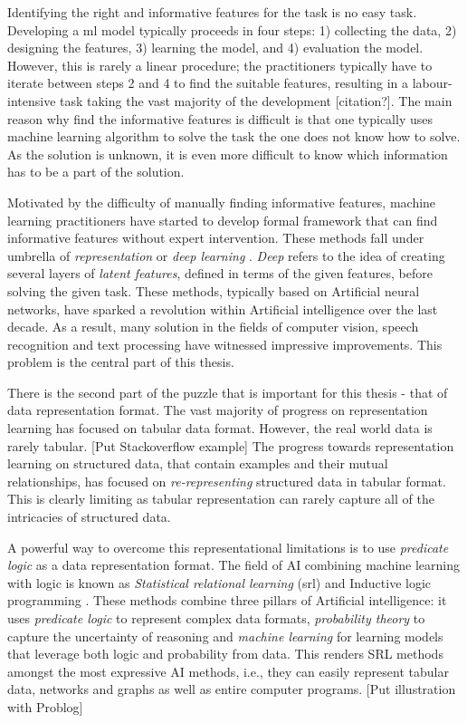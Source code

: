 Identifying the right and informative features for the task is no easy task.
Developing a \gls{ml} model typically proceeds in four steps: 1) collecting the data, 2) designing the features, 3) learning the model, and 4) evaluation the model.
However, this is rarely a linear procedure; the practitioners typically have to iterate between steps 2 and 4 to find the suitable features, resulting in a labour-intensive task taking the vast majority of the development [citation?].
The main reason why find the informative features is difficult is that one typically uses machine learning algorithm to solve the task the one does not know how to solve.
As the solution is unknown, it is even more difficult to know which information has to be a part of the solution.



Motivated by the difficulty of manually finding informative features, machine learning practitioners have started to develop formal framework that can find informative features without expert intervention.
These methods fall under umbrella of \textit{representation} or \textit{deep learning} \cite{Goodfellow2016, Bengio:2009}.
\textit{Deep} refers to the idea of creating several layers of \textit{latent features}, defined in terms of the given features, before solving the given task.
These methods, typically based on Artificial neural networks, have sparked a revolution within Artificial intelligence over the last decade.
As a result, many solution in the fields of computer vision, speech recognition and text processing have witnessed impressive improvements.
This problem is the central part of this thesis.



There is the second part of the puzzle that is important for this thesis - that of data representation format.
The vast majority of progress on representation learning has focused on tabular data format.
However, the real world data is rarely tabular. [Put Stackoverflow example]
The progress towards representation learning on structured data, that contain examples and their mutual relationships, has focused on \textit{re-representing} structured data in tabular format.
This is clearly limiting as tabular representation can rarely capture all of the intricacies of structured data. 



A powerful way to overcome this representational limitations is to use \textit{predicate logic} as a data representation format. 
The field of AI combining machine learning with logic is known as \textit{Statistical relational learning} (\gls{srl}) \cite{GetoorSRL,Raedt:2016:SRA:3027718} and Inductive logic programming \cite{LucRLbook}.
These methods combine three pillars of Artificial intelligence: it uses \textit{predicate logic} to represent complex data formats, \textit{probability theory} to capture the uncertainty of reasoning and \textit{machine learning} for learning models that leverage both logic and probability from data.
This renders SRL methods amongst the most expressive AI methods, i.e., they can easily represent tabular data, networks and graphs as well as entire computer programs. 
[Put illustration with Problog]



